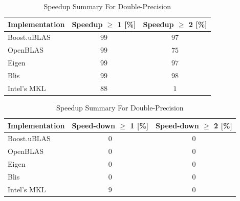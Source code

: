 \begin{table}[ht]
    \centering
    \caption{Speedup Summary For Double-Precision}
    \begin{tabular}{|l|c|c|}
        \hline
        \textbf{Implementation} & \textbf{Speedup $\geq$ 1 [\%]} & \textbf{Speedup $\geq$ 2 [\%]}\\
        \hline
        Boost.uBLAS & $99$ & $97$ \\
        \hline
        OpenBLAS    & $99$ & $75$ \\
        \hline
        Eigen       & $99$ & $97$ \\
        \hline
        Blis        & $99$ & $98$ \\
        \hline
        Intel's MKL & $88$ & $1$ \\
        \hline
    \end{tabular}

    \begin{tabular}{|l|c|c|}
        \hline
        \textbf{Implementation} & \textbf{Speed-down $\geq$ 1 [\%]} & \textbf{Speed-down $\geq$ 2 [\%]}\\
        \hline
        Boost.uBLAS & $0$ & $0$ \\
        \hline
        OpenBLAS    & $0$ & $0$ \\
        \hline
        Eigen       & $0$ & $0$ \\
        \hline
        Blis        & $0$ & $0$ \\
        \hline
        Intel's MKL & $9$ & $0$ \\
        \hline
    \end{tabular}
\end{table}


\clearpage

